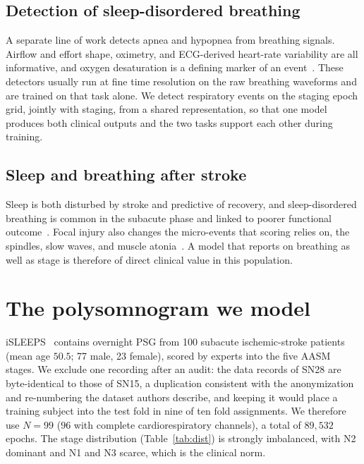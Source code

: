 \documentclass[journal]{IEEEtran}
\begin{document}
\subsection{Detection of sleep-disordered breathing}
A separate line of work detects apnea and hypopnea from breathing signals. Airflow and
effort shape, oximetry, and ECG-derived heart-rate variability are all informative, and
oxygen desaturation is a defining marker of an event~\cite{jing2025cpap}. These detectors
usually run at fine time resolution on the raw breathing waveforms and are trained on that
task alone. We detect respiratory events on the staging epoch grid, jointly with staging,
from a shared representation, so that one model produces both clinical outputs and the two
tasks support each other during training.

\subsection{Sleep and breathing after stroke}
Sleep is both disturbed by stroke and predictive of recovery, and sleep-disordered breathing
is common in the subacute phase and linked to poorer functional
outcome~\cite{bassetti2006sleep,denis2024sleep}. Focal injury also changes the micro-events
that scoring relies on, the spindles, slow waves, and muscle atonia~\cite{gottselig2002stroke,
fernandez2019spindles,simpson2023laterality}. A model that reports on breathing as well as
stage is therefore of direct clinical value in this population.

\section{The polysomnogram we model}
\label{sec:data}
iSLEEPS~\cite{maiti2026isleeps} contains overnight PSG from 100 subacute ischemic-stroke
patients (mean age $50.5$; 77 male, 23 female), scored by experts into the five AASM stages.
We exclude one recording after an audit: the data records of SN28 are byte-identical to
those of SN15, a duplication consistent with the anonymization and re-numbering the dataset
authors describe, and keeping it would place a training subject into the test fold in nine of
ten fold assignments. We therefore use $N=99$ ($96$ with complete cardiorespiratory
channels), a total of $89{,}532$ epochs. The stage distribution (Table~\ref{tab:dist}) is
strongly imbalanced, with N2 dominant and N1 and N3 scarce, which is the clinical norm.
\end{document}
